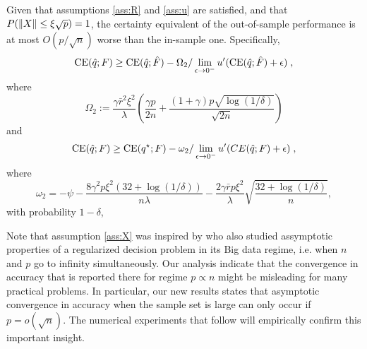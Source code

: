 \begin{coro}\label{coro:outsampleBoundBigData}
  Given that assumptions \ref{ass:R} and \ref{ass:u} are satisfied, and that
  $P(\|X\|\leq \xi\sqrt{p})=1$, the certainty equivalent of the out-of-sample
  performance is at most $O(p/\sqrt{n})$ worse than the in-sample one. Specifically,
  \[
    \operatorname{CE}({\hat{q}};F) \geq \operatorname{CE}({\hat{q}};{\hat{F}}) - \Omega_2/
    \lim_{\epsilon\to0^-}u'(\operatorname{CE}({\hat{q}};{\hat{F}})+\epsilon)\;,
  \]
  where
  \[
    \Omega_2 := \frac{\gamma\bar{r}^2\xi^2}{\lambda} \left(\frac{\gamma p}{2n} +
      \frac{(1+\gamma)p\sqrt{\log(1/\delta)}}{\sqrt{2n}}\right)
  \]
  and
  \[
    \operatorname{CE}(\hat q;F) \geq \operatorname{CE}(q^\star;F) - \omega_2/\lim_{\epsilon\to0^{-}}u'(CE(\hat q;F)+\epsilon)\;,
  \]
  where
  \[
    \omega_2 = -\psi -\frac{8\gamma^2p\xi^2(32+\log(1/\delta))}{n\lambda}
    -\frac{2\gamma\bar rp\xi^2}{\lambda}\sqrt{\frac{32+\log(1/\delta)}{n}},
  \]
  with probability $1-\delta$, 
\end{coro}

Note that assumption \ref{ass:X} was inspired by \cite{rudin2015big} who also studied
assymptotic properties of a regularized decision problem in its Big data regime, i.e. when
$n$ and $p$ go to infinity simultaneously. Our analysis indicate that the convergence in
accuracy that is reported there for regime $p\propto n$ might be misleading for many
practical problems.  In particular, our new results states that asymptotic convergence in
accuracy when the sample set is large can only occur if $p=o(\sqrt{n})$. The numerical
experiments that follow will empirically confirm this important insight.



